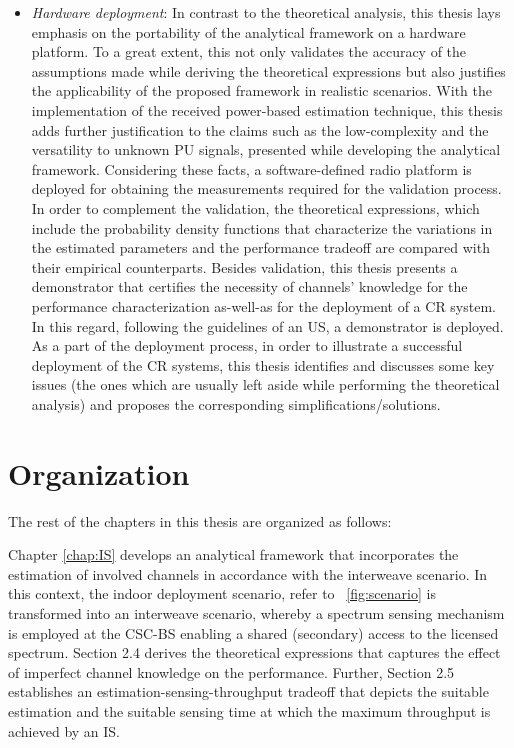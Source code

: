 \begin{itemize}
 
\item \textit{Hardware deployment}: 
In contrast to the theoretical analysis, this thesis lays emphasis on the portability of the analytical framework on a hardware platform. To a great extent, this not only validates the accuracy of the assumptions made while deriving the theoretical expressions but also justifies the applicability of the proposed framework in realistic scenarios. With the implementation of the received power-based estimation technique, this thesis adds further justification to the claims such as the low-complexity and the versatility to unknown PU signals, presented while developing the analytical framework. Considering these facts, a software-defined radio platform is deployed for obtaining the measurements required for the validation process. In order to complement the validation, the theoretical expressions, which include the probability density functions that characterize the variations in the estimated parameters and the performance tradeoff are compared with their empirical counterparts. Besides validation, this thesis presents a demonstrator that certifies the necessity of channels' knowledge for the performance characterization as-well-as for the deployment of a CR system. In this regard, following the guidelines of an US, a demonstrator is deployed. As a part of the deployment process, %
in order to illustrate a successful deployment of the CR systems, this thesis identifies and discusses some key issues (the ones which are usually left aside while performing the theoretical analysis) and proposes the corresponding simplifications/solutions.  
\end{itemize}

\section{Organization} 

The rest of the chapters in this thesis are organized as follows:

Chapter \ref{chap:IS} develops an analytical framework that incorporates the estimation of involved channels in accordance with the interweave scenario. In this context, the indoor deployment scenario, refer to \figurename~\ref{fig:scenario} is transformed into an interweave scenario, whereby a spectrum sensing mechanism is employed at the CSC-BS enabling a shared (secondary) access to the licensed spectrum. Section 2.4 derives the theoretical expressions that captures the effect of imperfect channel knowledge on the performance. Further, Section 2.5 establishes an estimation-sensing-throughput tradeoff that depicts the suitable estimation and the suitable sensing time at which the maximum throughput is achieved by an IS. 


